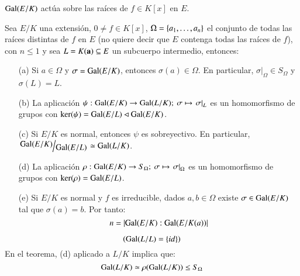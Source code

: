\begin{obs}
    $\mathrm{Gal}(E/K)$ actúa sobre las raíces de $f \in K[x]$ en $E$.
\end{obs}

\begin{thm}\label{thm:3.11}
    Sea $E/K$ una extensión, $0 \neq f \in K[x]$, $\Omega = \left\{a_1, \ldots, a_n\right\}$ el conjunto de todas las raíces distintas de $f$ en $E$ (no quiere decir que $E$ contenga todas las raíces de $f$), con $n \leq 1$ y sea $L = K(\mathbf{a}) \subseteq E$ un subcuerpo intermedio, entonces:
    \begin{itemize}
        \item[(a)] Si $a \in \Omega$ y $\sigma = \mathrm{Gal}(E/K)$, entonces $\sigma(a) \in \Omega$. En particular, $\left.\sigma\right|_\Omega \in S_\Omega$ y $\sigma(L) = L$.
        \item[(b)] La aplicación $\psi: \mathrm{Gal}(E/K) \to \mathrm{Gal}(L/K);\ \sigma \mapsto \left.\sigma\right|_L$ es un homomorfismo de grupos con $\ker(\psi) = \mathrm{Gal}(E/L) \lhd \mathrm{Gal}(E/K)$.
        \item[(c)] Si $E/K$ es normal, entonces $\psi$ es sobreyectivo. En particular, $\quo{\gal(E/K)}{\gal(E/L)} \isom \gal(L/K)$.
        \item[(d)] La aplicación $\rho: \mathrm{Gal}(E/K) \to S_\Omega;\ \sigma \mapsto \left.\sigma\right|_\Omega$ es un homomorfismo de grupos con $\ker(\rho) = \mathrm{Gal}(E/L)$.
        \item[(e)] Si $E/K$ es normal y $f$ es irreducible, dados $a, b \in \Omega$ existe $\sigma \in \mathrm{Gal}(E/K)$ tal que $\sigma(a) = b$. Por tanto:
        $$
            n = \left|\mathrm{Gal}(E/K):\mathrm{Gal}(E/K(a))\right|
        $$
    \end{itemize}
\end{thm}

\begin{obs}
    $$
        \left(\mathrm{Gal}(L/L) = \left\{id\right\}\right)
    $$
    En el teorema, (d) aplicado a $L/K$ implica que:
    $$
        \mathrm{Gal}(L/K) \simeq \rho(\mathrm{Gal}(L/K)) \leq S_\Omega
    $$
\end{obs}

